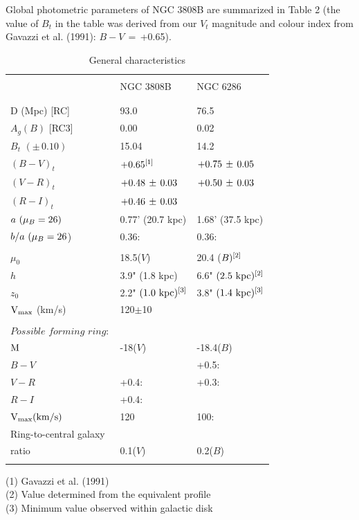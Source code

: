 Global photometric parameters of NGC 3808B are summarized in Table 2
(the value of $B_{t}$ in the table was derived from our $V_{t}$
magnitude and colour index from Gavazzi et al. (1991):
$B-V\,=\,$+0.65). 


\begin{table}
\caption[2]{General characteristics}
\begin{tabular}{lll}
\\ \\
\hline
\\
             & NGC 3808B &  NGC 6286 \\ \\
\hline \\
D (Mpc) [RC] & 93.0      &  76.5        \\
$A_{g}(B)$ [RC3] &  0.00     &   0.02    \\
$B_{t}\,\, (\pm\,0.10)$& 15.04  &  14.2   \\
$(B-V)_{t}$  & $\rm +0.65^{[1]}$   & $\rm +0.75\,\pm\,0.05$   \\
$(V-R)_{t}$& $\rm +0.48\,\pm\,0.03$& $\rm +0.50\,\pm\,0.03$  \\
$(R-I)_{t}$& $\rm +0.46\,\pm\,0.03$ \\
$ a\,\,(\mu_{B}=\rm 26)$ & 0.77' (20.7 kpc) & 1.68' (37.5 kpc) \\
$ b/a\,\,(\mu_{B}=\rm 26$)& 0.36:   & 0.36:      \\ \\
$\mu_{0}$  &  18.5($V$)  &  20.4 ($ B)^{\rm [2]}$  \\
$h$           & 3.9" (1.8 kpc)&  6.6" $\rm (2.5\,\,kpc)^{[2]}$ \\
$z_{0}$ & 2.2" $\rm (1.0\,\,kpc)^{[3]}$& 3.8" $\rm (1.4\,\,kpc)^{[3]}$ \\
$\rm V_{max}$ (km/s) & 120$\pm$10        \\ \\
$Possible\,\,forming\,\,ring:$ \\
$\rm M $ &  -18($V$)  &     -18.4($B$)      \\
$ B-V $ &           &   +0.5:               \\
$ V-R $ &  +0.4:  &      +0.3:               \\
$ R-I $ &  +0.4:  & \\
$\rm V_{max} (km/s) $& 120  & 100:\\
Ring-to-central galaxy\\
ratio                    &   0.1($V$) &  0.2($B$)         \\ \\
\hline
\end{tabular}

(1) Gavazzi et al. (1991)  \\
(2) Value determined from the equivalent profile        \\
(3) Minimum value observed within galactic disk           \\
\end{table}

